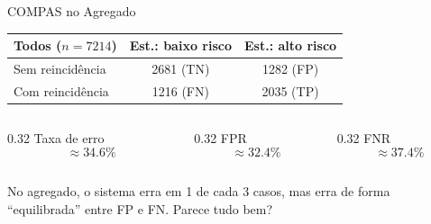 \documentclass[aspectratio=169,xcolor=dvipsnames]{beamer}
\begin{document}
  \begin{frame}{COMPAS no Agregado}
    \centering
    \renewcommand{\arraystretch}{1.3}
    \begin{tabular}{lcc}
      \toprule
      \textbf{Todos} ($n = 7214$) & \textbf{Est.: baixo risco} & \textbf{Est.: alto risco} \\
      \midrule
      Sem reincidência & 2681 (TN) & 1282 (FP) \\
      Com reincidência & 1216 (FN) & 2035 (TP) \\
      \bottomrule
    \end{tabular}

    \vspace{0.8em}
    \begin{columns}
      \begin{column}{0.32\textwidth}
        \centering
        Taxa de erro \[ \approx 34.6\% \]
      \end{column}
      \begin{column}{0.32\textwidth}
        \centering
        FPR \[ \approx 32.4\% \]
      \end{column}
      \begin{column}{0.32\textwidth}
        \centering
        FNR \[ \approx 37.4\% \]
      \end{column}
    \end{columns}

    \vspace{0.5em}
    No agregado, o sistema erra em 1 de cada 3 casos, mas erra de forma \enquote{equilibrada} entre FP e FN. Parece tudo bem?
  \end{frame}
\end{document}
